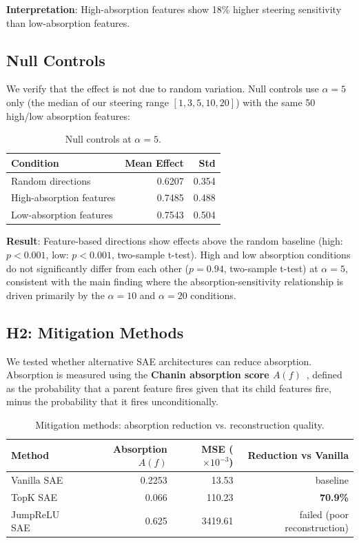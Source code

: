 \documentclass{article}
\begin{document}
\textbf{Interpretation}: High-absorption features show 18\% higher steering sensitivity than low-absorption features.

\subsection{Null Controls}

We verify that the effect is not due to random variation. Null controls use $\alpha=5$ only (the median of our steering range $[1, 3, 5, 10, 20]$) with the same 50 high/low absorption features:

\begin{table}[t]
\caption{Null controls at $\alpha=5$.}
\label{tab:null-controls}
\centering
\begin{tabular}{lrr}
\toprule
Condition & Mean Effect & Std \\
\midrule
Random directions & 0.6207 & 0.354 \\
High-absorption features & 0.7485 & 0.488 \\
Low-absorption features & 0.7543 & 0.504 \\
\bottomrule
\end{tabular}
\end{table}

\textbf{Result}: Feature-based directions show effects above the random baseline (high: $p<0.001$, low: $p<0.001$, two-sample t-test). High and low absorption conditions do not significantly differ from each other ($p=0.94$, two-sample t-test) at $\alpha=5$, consistent with the main finding where the absorption-sensitivity relationship is driven primarily by the $\alpha=10$ and $\alpha=20$ conditions.

\subsection{H2: Mitigation Methods}

We tested whether alternative SAE architectures can reduce absorption. Absorption is measured using the \textbf{Chanin absorption score $A(f)$}~\citep{chanin2024spectral}, defined as the probability that a parent feature fires given that its child features fire, minus the probability that it fires unconditionally.

\begin{table}[t]
\caption{Mitigation methods: absorption reduction vs. reconstruction quality.}
\label{tab:mitigation}
\centering
\begin{tabular}{lrrr}
\toprule
Method & Absorption $A(f)$ & MSE ($\times 10^{-3}$) & Reduction vs Vanilla \\
\midrule
Vanilla SAE & 0.2253 & 13.53 & baseline \\
TopK SAE & 0.066 & 110.23 & \textbf{70.9\%} \\
JumpReLU SAE & 0.625 & 3419.61 & failed (poor reconstruction) \\
\bottomrule
\end{tabular}
\end{table}
\end{document}
